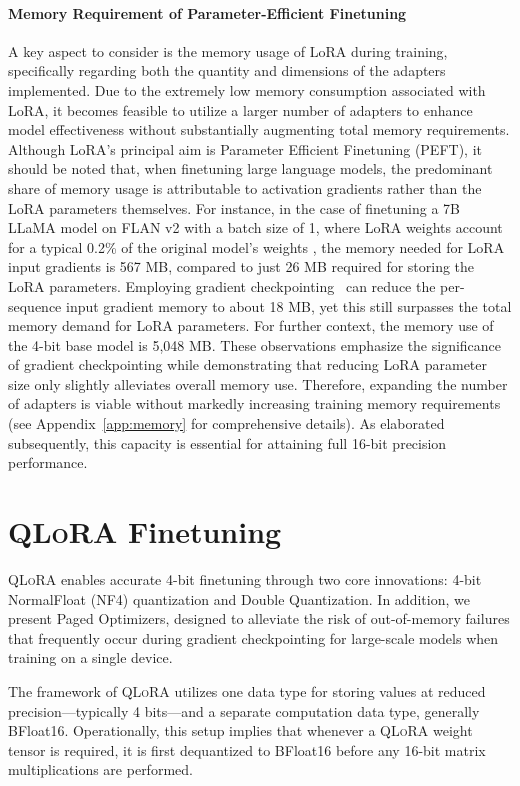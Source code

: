 \paragraph{Memory Requirement of Parameter-Efficient Finetuning} A key aspect to consider is the memory usage of LoRA during training, specifically regarding both the quantity and dimensions of the adapters implemented. Due to the extremely low memory consumption associated with LoRA, it becomes feasible to utilize a larger number of adapters to enhance model effectiveness without substantially augmenting total memory requirements. Although LoRA’s principal aim is Parameter Efficient Finetuning (PEFT), it should be noted that, when finetuning large language models, the predominant share of memory usage is attributable to activation gradients rather than the LoRA parameters themselves. For instance, in the case of finetuning a 7B LLaMA model on FLAN v2 with a batch size of 1, where LoRA weights account for a typical 0.2\% of the original model’s weights \citep{hu2021lora,liu2022few}, the memory needed for LoRA input gradients is 567 MB, compared to just 26 MB required for storing the LoRA parameters. Employing gradient checkpointing~\citep{chen2016training} can reduce the per-sequence input gradient memory to about 18 MB, yet this still surpasses the total memory demand for LoRA parameters. For further context, the memory use of the 4-bit base model is 5,048 MB. These observations emphasize the significance of gradient checkpointing while demonstrating that reducing LoRA parameter size only slightly alleviates overall memory use. Therefore, expanding the number of adapters is viable without markedly increasing training memory requirements (see Appendix~\ref{app:memory} for comprehensive details). As elaborated subsequently, this capacity is essential for attaining full 16-bit precision performance.

\section{\textsc{QLoRA} Finetuning}

\textsc{QLoRA} enables accurate 4-bit finetuning through two core innovations: 4-bit NormalFloat (NF4) quantization and Double Quantization. In addition, we present Paged Optimizers, designed to alleviate the risk of out-of-memory failures that frequently occur during gradient checkpointing for large-scale models when training on a single device.

The framework of \textsc{QLoRA} utilizes one data type for storing values at reduced precision—typically 4 bits—and a separate computation data type, generally BFloat16. Operationally, this setup implies that whenever a \textsc{QLoRA} weight tensor is required, it is first dequantized to BFloat16 before any 16-bit matrix multiplications are performed.

